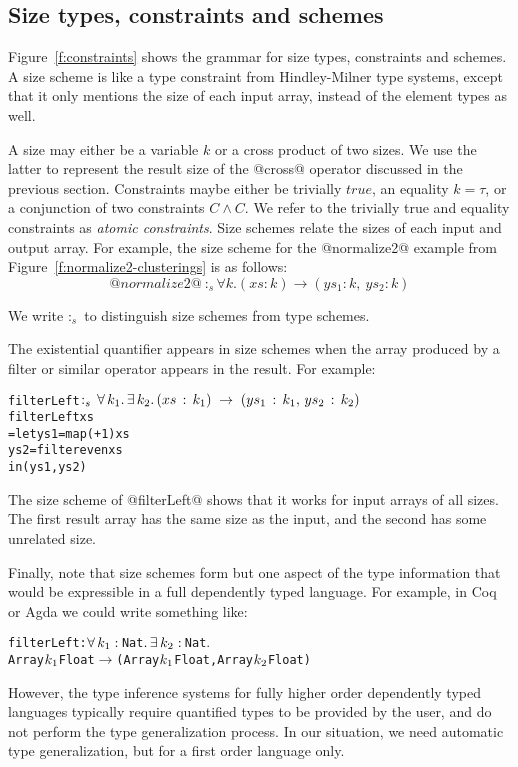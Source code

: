 \newcommand{\constr}[1]{\llbracket #1 \rrbracket}


\subsection{Size types, constraints and schemes}
\label{s:SizeTypes}
Figure~\ref{f:constraints} shows the grammar for size types, constraints and schemes. A size scheme is like a type constraint from Hindley-Milner type systems, except that it only mentions the size of each input array, instead of the element types as well.

A size may either be a variable $k$ or a cross product of two sizes. We use the latter to represent the result size of the @cross@ operator discussed in the previous section. Constraints maybe either be trivially $true$, an equality $k = \tau$, or a conjunction of two constraints $C \wedge C$. We refer to the trivially true and equality constraints as \emph{atomic constraints}. Size schemes relate the sizes of each input and output array. For example, the size scheme for the @normalize2@ example from Figure~\ref{f:normalize2-clusterings} is as follows:
$$@normalize2@ ~:_s \forall k. (xs : k) \to (ys_1 : k,~ ys_2 : k)
$$

We write $:_s$ to distinguish size schemes from type schemes.

The existential quantifier appears in size schemes when the array produced by a filter or similar operator appears in the result. For example:
\begin{alltt}
 filterLeft \(:\sb{s}\,\forall\,k\sb{1}.\,\exists\,k\sb{2}.\,(xs\,:\,k\sb{1})\;\to\;(ys\sb{1}\,:\,k\sb{1},\,ys\sb{2}\,:\,k\sb{2})\)
 filterLeft xs
   = let ys1 = map (+ 1)   xs
         ys2 = filter even xs
     in (ys1, ys2)
\end{alltt}

The size scheme of @filterLeft@ shows that it works for input arrays of all sizes. The first result array has the same size as the input, and the second has some unrelated size.

Finally, note that size schemes form but one aspect of the type information that would be expressible in a full dependently typed language. For example, in Coq or Agda we could write something like:
\begin{alltt}
 filterLeft : \(\forall\,k\sb{1}:\,\)Nat\(.\,\exists\,k\sb{2}:\,\)Nat\(.\) 
   Array \(k\sb{1}\) Float \(\to\) (Array \(k\sb{1}\) Float, Array \(k\sb{2}\) Float)
\end{alltt}
However, the type inference systems for fully higher order dependently typed languages typically require quantified types to be provided by the user, and do not perform the type generalization process. In our situation, we need automatic type generalization, but for a first order language only.


